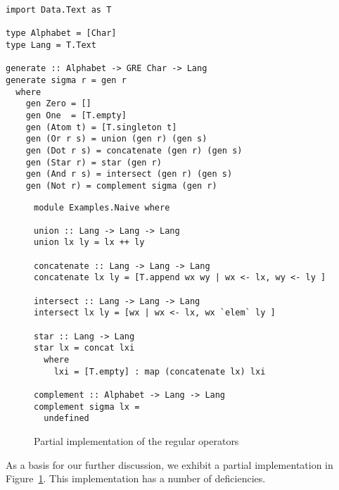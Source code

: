\begin{lstlisting}
import Data.Text as T

type Alphabet = [Char]
type Lang = T.Text

generate :: Alphabet -> GRE Char -> Lang
generate sigma r = gen r
  where
    gen Zero = []
    gen One  = [T.empty]
    gen (Atom t) = [T.singleton t]
    gen (Or r s) = union (gen r) (gen s)
    gen (Dot r s) = concatenate (gen r) (gen s)
    gen (Star r) = star (gen r)
    gen (And r s) = intersect (gen r) (gen s)
    gen (Not r) = complement sigma (gen r)
\end{lstlisting}
\begin{figure}[tp]
\begin{lstlisting}
module Examples.Naive where

union :: Lang -> Lang -> Lang
union lx ly = lx ++ ly

concatenate :: Lang -> Lang -> Lang
concatenate lx ly = [T.append wx wy | wx <- lx, wy <- ly ]

intersect :: Lang -> Lang -> Lang
intersect lx ly = [wx | wx <- lx, wx `elem` ly ]

star :: Lang -> Lang
star lx = concat lxi
  where
    lxi = [T.empty] : map (concatenate lx) lxi

complement :: Alphabet -> Lang -> Lang
complement sigma lx =
  undefined
\end{lstlisting}
  \caption{Partial implementation of the regular operators}
  \label{fig:regular-operators-0}
\end{figure}
As a basis for our further discussion, we exhibit a partial 
implementation in Figure~\ref{fig:regular-operators-0}.
This implementation has a number of deficiencies.
